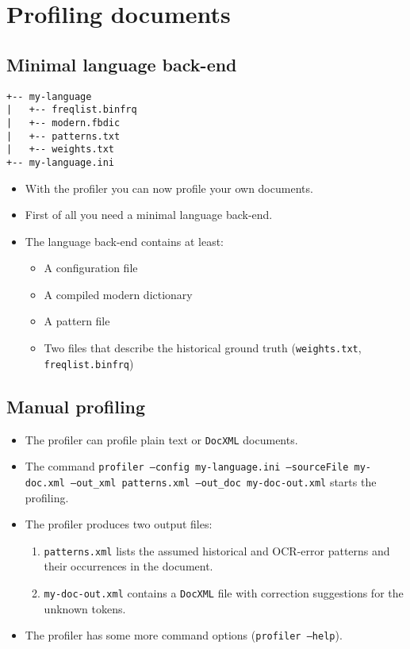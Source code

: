 \section{Profiling documents}
\subsection{Minimal language back-end}
\begin{frame}[fragile]
\begin{Verbatim}
+-- my-language
|   +-- freqlist.binfrq
|   +-- modern.fbdic
|   +-- patterns.txt
|   +-- weights.txt
+-- my-language.ini
\end{Verbatim}
	\begin{itemize}
		\item With the profiler you can now profile your own documents.
		\item First of all you need a minimal language back-end.
		\item The language back-end contains at least:
			\begin{itemize}
				\item A configuration file
				\item A compiled modern dictionary
				\item A pattern file
				\item Two files that describe the historical ground truth
					(\texttt{weights.txt}, \texttt{freqlist.binfrq})
			\end{itemize}
	\end{itemize}
\end{frame}

\subsection{Manual profiling}
\begin{frame}
	\begin{itemize}
		\item The profiler can profile plain text or \texttt{DocXML}
			documents.
		\item The command \texttt{profiler --config my-language.ini --sourceFile my-doc.xml
			--out\_xml patterns.xml --out\_doc my-doc-out.xml} starts the profiling.
		\item The profiler produces two output files:
			\begin{enumerate}
				\item \texttt{patterns.xml} lists the assumed historical and OCR-error
					patterns and their occurrences in the document.
				\item \texttt{my-doc-out.xml} contains a \texttt{DocXML} file with
					correction suggestions for the unknown tokens.
			\end{enumerate}
		\item The profiler has some more command options (\texttt{profiler --help}).
	\end{itemize}
\end{frame}

